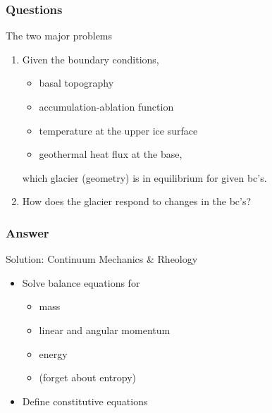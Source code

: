 \documentclass[hide notes,intlimits]{beamer}
\begin{document}
\begin{frame}
  \frametitle{Questions}
 \begin{block}{The two major problems}
   \begin{enumerate}
   \item Given the boundary conditions,
     \begin{itemize}
     \item basal topography
     \item accumulation-ablation function
     \item temperature at the upper ice surface
     \item geothermal heat flux at the base,
   \end{itemize}
   which glacier (geometry) is in equilibrium for given bc's.
  \item How does the glacier respond to changes in the bc's?
\end{enumerate}
  \end{block}
\end{frame}

\begin{frame}
  \frametitle{Answer}

 \begin{block}{Solution: Continuum Mechanics \& Rheology}
   \begin{itemize}
     \item Solve balance equations for
       \begin{itemize}
       \item mass
       \item linear and angular momentum
       \item energy
       \item (forget about entropy)
       \end{itemize}
     \item Define constitutive equations
  \end{itemize}
\end{block}
\end{frame}
\end{document}
